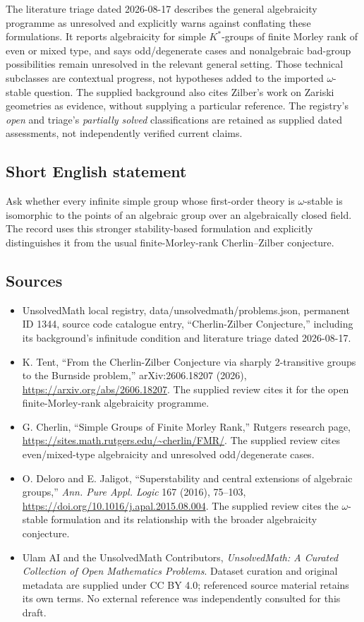 \documentclass[11pt]{article}
\begin{document}
The literature triage dated 2026-08-17 describes the general algebraicity programme as unresolved and explicitly warns against conflating these formulations. It reports algebraicity for simple $K^*$-groups of finite Morley rank of even or mixed type, and says odd/degenerate cases and nonalgebraic bad-group possibilities remain unresolved in the relevant general setting. Those technical subclasses are contextual progress, not hypotheses added to the imported $\omega$-stable question. The supplied background also cites Zilber's work on Zariski geometries as evidence, without supplying a particular reference. The registry's \emph{open} and triage's \emph{partially solved} classifications are retained as supplied dated assessments, not independently verified current claims.
\subsection{Short English statement}
Ask whether every infinite simple group whose first-order theory is $\omega$-stable is isomorphic to the points of an algebraic group over an algebraically closed field. The record uses this stronger stability-based formulation and explicitly distinguishes it from the usual finite-Morley-rank Cherlin--Zilber conjecture.
\subsection{Sources}
\begin{itemize}
\item UnsolvedMath local registry, data/unsolvedmath/problems.json, permanent ID 1344, source code catalogue entry, ``Cherlin-Zilber Conjecture,'' including its background's infinitude condition and literature triage dated 2026-08-17.
\item K. Tent, ``From the Cherlin-Zilber Conjecture via sharply 2-transitive groups to the Burnside problem,'' arXiv:2606.18207 (2026), \url{https://arxiv.org/abs/2606.18207}. The supplied review cites it for the open finite-Morley-rank algebraicity programme.
\item G. Cherlin, ``Simple Groups of Finite Morley Rank,'' Rutgers research page, \url{https://sites.math.rutgers.edu/~cherlin/FMR/}. The supplied review cites even/mixed-type algebraicity and unresolved odd/degenerate cases.
\item O. Deloro and E. Jaligot, ``Superstability and central extensions of algebraic groups,'' \emph{Ann. Pure Appl. Logic} 167 (2016), 75--103, \url{https://doi.org/10.1016/j.apal.2015.08.004}. The supplied review cites the $\omega$-stable formulation and its relationship with the broader algebraicity conjecture.
\item Ulam AI and the UnsolvedMath Contributors, \emph{UnsolvedMath: A Curated Collection of Open Mathematics Problems}. Dataset curation and original metadata are supplied under CC BY 4.0; referenced source material retains its own terms. No external reference was independently consulted for this draft.
\end{itemize}
\end{document}
